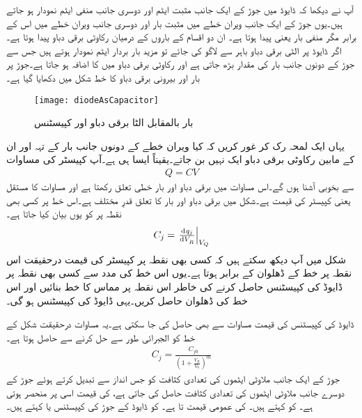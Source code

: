 آپ نے دیکھا کہ  ڈایوڈ میں جوڑ کے ایک جانب مثبت ایٹم اور دوسری جانب منفی ایٹم نمودار ہو جاتے ہیں۔یوں جوڑ کے ایک جانب ویران خطے میں مثبت بار  اور دوسری جانب ویران خطے میں اس کے برابر مگر منفی بار یعنی  پیدا ہوتا ہے۔ ان دو اقسام کے باروں کے درمیان رکاوٹی برقی دباو  پیدا ہوتا ہے۔اگر  ڈایوڈ پر الٹی برقی دباو   باہر سے لاگو کی جائے تو مزید بار بردار ایٹم نمودار ہوتے ہیں جس سے جوڑ کے دونوں جانب بار کی مقدار بڑھ جاتی ہے اور رکاوٹی برقی دباو میں  کا اضافہ ہو جاتا ہے۔جوڑ پر بار  اور بیرونی برقی دباو   کا خط شکل   میں دکھایا گیا ہے۔
\begin{figure}
\centering
\texttt{[image: diodeAsCapacitor]}
\caption{بار بالمقابل الٹا برقی دباو اور کپیسٹنس}
\label{شکل_ڈایوڈ_بطور_کپیسٹر}
\end{figure}
یہاں ایک لمحہ رک کر غور کریں کہ کیا ویران خطے کے دونوں جانب بار کے تہہ اور ان کے مابین رکاوٹی برقی دباو ایک  نہیں بن جاتے۔یقیناً ایسا ہی ہے۔آپ کپیسٹر کی مساوات
\begin{align}
Q=C V
\end{align}
سے بخوبی آشنا ہوں گے۔اس مساوات میں برقی دباو اور بار خطی تعلق رکھتا ہے اور مساوات کا مستقل یعنی  کپیسٹر کی قیمت ہے۔شکل   میں برقی دباو اور بار کا تعلق قدرِ مختلف ہے۔اس خط پر کسی بھی نقطہ پر  کو یوں بیان کیا جاتا ہے۔
\begin{align}
C_j = \left . \od{q_j}{V_R} \right |_{V_Q}
\end{align}
شکل میں آپ دیکھ سکتے ہیں کہ کسی بھی نقطہ پر کپیسٹر کی قیمت درحقیقت اس نقطہ پر خط کے ڈھلوان کے برابر ہوتا ہے۔یوں اس خط کی مدد سے کسی بھی نقطہ پر ڈایوڈ کی کپیسٹنس حاصل کرنے کی خاطر اس نقطہ پر مماس کا خط بنائیں اور اس خط کی ڈھلوان حاصل کریں۔یہی ڈایوڈ کی کپیسٹنس ہو گی۔

ڈایوڈ کی کپیسٹنس  کی قیمت  مساوات   سے بھی حاصل کی جا سکتی ہے۔یہ مساوات درحقیقت شکل   کے خط کو الجبرائی طور سے حل کرنے سے حاصل ہوتا ہے۔
\begin{align} \label{مساوات_ڈایوڈ_کپیسٹنس}
C_j = \frac{C_{j0}}{\left(1+\frac{V_R}{V_0} \right )^m}
\end{align}
جوڑ کے ایک جانب   ملاوٹی ایٹموں کی تعدادی کثافت کو جس انداز سے تبدیل کرتے ہوئے جوڑ کے دوسرے جانب  ملاوٹی ایٹموں کی تعدادی کثافت حاصل کی جاتی ہے،  کی قیمت اسی پر منحصر ہوتی ہے۔ کو  کہتے ہیں۔  کی عمومی قیمت  تا  ہے۔  کو ڈایوڈ کے جوڑ کی کپیسٹنس یا   کہتے ہیں۔

